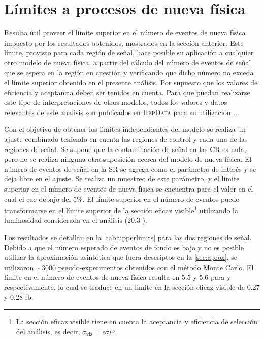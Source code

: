 

\section{Límites a procesos de nueva física} \label{sec:model_independent}

Resulta útil proveer el límite superior en el número de eventos de
nueva física impuesto por los resultados obtenidos, mostrados en la sección
anterior. Este límite, provisto para
cada región de señal, hace posible su aplicación a cualquier otro modelo de
nueva física, a partir del cálculo del número de eventos de señal que se espera
en la región en cuestión y verificando que dicho número no exceda el límite
superior obtenido en el presente análisis. Por supuesto que los valores de eficiencia y aceptancia deben ser
tenidos en cuenta.
Para que puedan realizarse este tipo de interpretaciones de otros modelos, todos
los valores y datos relevantes de este analisis son publicados en \textsc{HepData}
para su utilización \cite{hepdata}...

Con el objetivo de obtener los limites independientes del modelo se realiza un
ajuste combinado teniendo en cuenta las regiones de control y cada una de las
regiones de señal. Se supone que la contaminación de señal en las CR es nula,
pero no se realiza ninguna otra suposición acerca del modelo de nueva física. El
número de eventos de señal en la SR se agrega como el parámetro de interés y se
deja libre en el ajuste. Se realiza un muestreo de este parámetro, y el
límite superior en el número de eventos de nueva física se encuentra para el
valor en el cual el {\cls} cae debajo del 5\%. El límite superior en el número
de eventos puede transformarse en el límite superior de la sección eficaz
visible\footnote{La sección eficaz visible tiene en cuenta
  la aceptancia y eficiencia de selección del análisis, es decir, $\sigma_{\text{vis}} = \epsilon\sigma$}
utilizando la luminosidad considerada en el análisis
(20.3 \ifb).

Los resultados se detallan en la \cref{tab:upperlimits} para las dos regiones de
señal. Debido a que el número esperado de eventos de fondo es bajo y no es
posible utilizar la aproximación asintótica que fuera descriptos en la \cref{sec:aprox},
se utilizaron $\sim 3000$
pseudo-experimentos obtenidos con el método Monte Carlo. El límite en el número
de eventos de nueva física resulta en 5.5 y 5.6 para {\SRL} y {\SRH}
respectivamente, lo cual se traduce en un limite en la sección eficaz visible de
0.27 y 0.28 fb.



